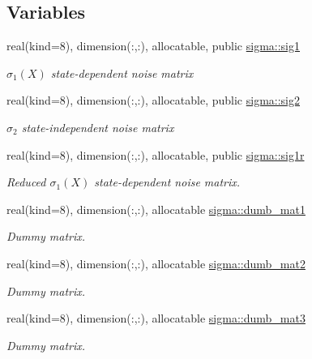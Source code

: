 \subsection*{Variables}
\begin{DoxyCompactItemize}
\item 
real(kind=8), dimension(\+:,\+:), allocatable, public \hyperlink{namespacesigma_a0aa2ecf44409fa5bc486137f146dfccc}{sigma\+::sig1}
\begin{DoxyCompactList}\small\item\em $\sigma_1(X)$ state-\/dependent noise matrix \end{DoxyCompactList}\item 
real(kind=8), dimension(\+:,\+:), allocatable, public \hyperlink{namespacesigma_a7a2602ed785ed3a15dbac6e6b0dfce02}{sigma\+::sig2}
\begin{DoxyCompactList}\small\item\em $\sigma_2$ state-\/independent noise matrix \end{DoxyCompactList}\item 
real(kind=8), dimension(\+:,\+:), allocatable, public \hyperlink{namespacesigma_a1264db44a7cd295a43de11460bcb5bbe}{sigma\+::sig1r}
\begin{DoxyCompactList}\small\item\em Reduced $\sigma_1(X)$ state-\/dependent noise matrix. \end{DoxyCompactList}\item 
real(kind=8), dimension(\+:,\+:), allocatable \hyperlink{namespacesigma_ab1b904a05acf6ebc4f8a35ad55f5b9b6}{sigma\+::dumb\+\_\+mat1}
\begin{DoxyCompactList}\small\item\em Dummy matrix. \end{DoxyCompactList}\item 
real(kind=8), dimension(\+:,\+:), allocatable \hyperlink{namespacesigma_a74726cc22665d4fde608f992a262f04e}{sigma\+::dumb\+\_\+mat2}
\begin{DoxyCompactList}\small\item\em Dummy matrix. \end{DoxyCompactList}\item 
real(kind=8), dimension(\+:,\+:), allocatable \hyperlink{namespacesigma_aa1cf7af9d091c183b2308f0f65786909}{sigma\+::dumb\+\_\+mat3}
\begin{DoxyCompactList}\small\item\em Dummy matrix. \end{DoxyCompactList}\item 

\end{DoxyCompactItemize}

